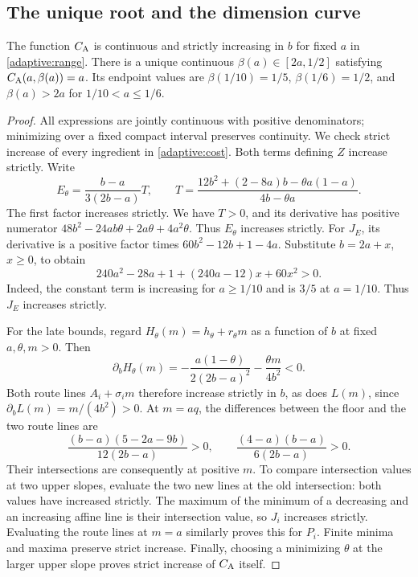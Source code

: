 \subsection{The unique root and the dimension curve}
\begin{lemma}\label{adaptive:root}
The function \(C_{\rm A}\) is continuous and strictly increasing in \(b\)
for fixed \(a\) in \eqref{adaptive:range}. There is a unique continuous
\(\beta(a)\in[2a,1/2]\) satisfying \(C_{\rm A}(a,\beta(a))=a\).
Its endpoint values are \(\beta(1/10)=1/5\), \(\beta(1/6)=1/2\),
and \(\beta(a)>2a\) for \(1/10<a\le1/6\).
\end{lemma}
\begin{proof}
All expressions are jointly continuous with positive denominators;
minimizing over a fixed compact interval preserves continuity.
We check strict increase of every ingredient in \eqref{adaptive:cost}.
Both terms defining \(Z\) increase strictly. Write
\[
 E_\theta=\frac{b-a}{3(2b-a)}T,\qquad
 T=\frac{12b^2+(2-8a)b-\theta a(1-a)}{4b-\theta a}.
\]
The first factor increases strictly. We have \(T>0\), and its derivative
has positive numerator
\(48b^2-24ab\theta+2a\theta+4a^2\theta\).
Thus \(E_\theta\) increases strictly. For \(J_E\), its derivative is
a positive factor times \(60b^2-12b+1-4a\). Substitute
\(b=2a+x\), \(x\ge0\), to obtain
\[
 240a^2-28a+1+(240a-12)x+60x^2>0.
\]
Indeed, the constant term is increasing for \(a\ge1/10\) and is
\(3/5\) at \(a=1/10\). Thus \(J_E\) increases strictly.

For the late bounds, regard \(H_\theta(m)=h_\theta+r_\theta m\)
as a function of \(b\) at fixed \(a,\theta,m>0\). Then
\[
 \partial_b H_\theta(m)
 =-\frac{a(1-\theta)}{2(2b-a)^2}-\frac{\theta m}{4b^2}<0.
\]
Both route lines \(A_i+\sigma_i m\) therefore increase strictly in
\(b\), as does \(L(m)\), since \(\partial_b L(m)=m/(4b^2)>0\).
At \(m=aq\), the differences between the floor and the two route lines are
\[
 \frac{(b-a)(5-2a-9b)}{12(2b-a)}>0,
 \qquad \frac{(4-a)(b-a)}{6(2b-a)}>0.
\]
Their intersections are consequently at positive \(m\). To compare
intersection values at two upper slopes, evaluate the two new lines at
the old intersection: both values have increased strictly. The maximum
of the minimum of a decreasing and an increasing affine line is their
intersection value, so \(J_i\) increases strictly. Evaluating the route
lines at \(m=a\) similarly proves this for \(P_i\).
Finite minima and maxima preserve strict increase. Finally, choosing a
minimizing \(\theta\) at the larger upper slope proves strict increase
of \(C_{\rm A}\) itself.


\end{proof}
